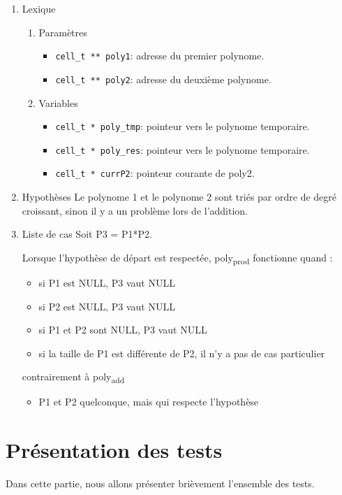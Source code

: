 \documentclass[11pt]{article}
\begin{document}
\begin{enumerate}
\item Lexique
\label{sec:orgc176a1f}
\begin{enumerate}
\item Paramètres
\label{sec:org46e5ad0}
\begin{itemize}
\item \texttt{cell\_t ** poly1}: adresse du premier polynome.
\item \texttt{cell\_t ** poly2}: adresse du deuxième polynome.
\end{itemize}
\item Variables
\label{sec:orgb5deb0a}
\begin{itemize}
\item \texttt{cell\_t * poly\_tmp}: pointeur vers le polynome temporaire.
\item \texttt{cell\_t * poly\_res}: pointeur vers le polynome temporaire.
\item \texttt{cell\_t * currP2}: pointeur courante de poly2.
\end{itemize}
\end{enumerate}


\item Hypothèses
\label{sec:org1b2c1d5}
Le polynome 1 et le polynome 2 sont triés par ordre de degré croissant, sinon
il y a un problème lors de l'addition.

\item Liste de cas
\label{sec:org3acb5b2}
Soit P3 = P1*P2.

Lorsque l'hypothèse de départ est respectée, poly\textsubscript{prod} fonctionne quand :
\begin{itemize}
\item si P1 est NULL, P3 vaut NULL
\item si P2 est NULL, P3 vaut NULL
\item si P1 et P2 sont NULL, P3 vaut NULL
\item si la taille de P1 est différente de P2, il n'y a pas de cas particulier
\end{itemize}
contrairement à poly\textsubscript{add}
\begin{itemize}
\item P1 et P2 quelconque, mais qui respecte l'hypothèse
\end{itemize}
\end{enumerate}


\section{Présentation des tests}
\label{sec:org1db1bb2}
Dans cette partie, nous allons présenter brièvement l'ensemble des tests.
\end{document}
